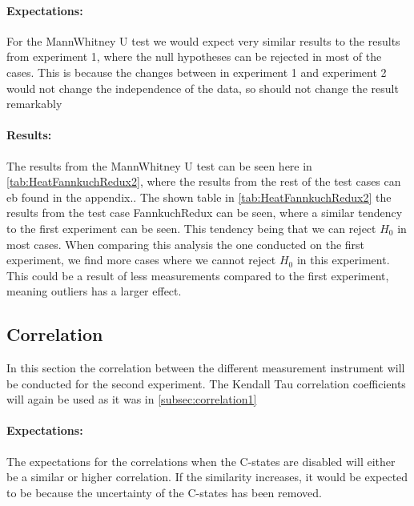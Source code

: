 \paragraph{Expectations:} For the MannWhitney U test we would expect very similar results to the results from experiment 1, where the null hypotheses can be rejected in most of the cases. This is because the changes between in experiment 1 and experiment 2 would not change the independence of the data, so should not change the result remarkably



\paragraph{Results:} The results from the MannWhitney U test can be seen here in \cref{tab:HeatFannkuchRedux2}, where the results from the rest of the test cases can eb found in the appendix.. The shown table in \cref{tab:HeatFannkuchRedux2} the results from the test case FannkuchRedux can be seen, where a similar tendency to the first experiment can be seen. This tendency being that we can reject $H_0$ in most cases. When comparing this analysis the one conducted on the first experiment, we find more cases where we cannot reject $H_0$ in this experiment. This could be a result of less measurements compared to the first experiment, meaning outliers has a larger effect.

\subsection{Correlation}\label{subsec:correlation2}
In this section the correlation between the different measurement instrument will be conducted for the second experiment. The Kendall Tau correlation coefficients will again be used as it was in \cref{subsec:correlation1}

\paragraph{Expectations:} The expectations for the correlations when the C-states are disabled will either be a similar or higher correlation. If the similarity increases, it would be expected to be because the uncertainty of the C-states has been removed.




